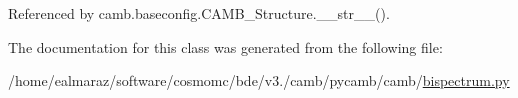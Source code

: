 Referenced by camb.\+baseconfig.\+C\+A\+M\+B\+\_\+\+Structure.\+\_\+\+\_\+str\+\_\+\+\_\+().



The documentation for this class was generated from the following file\+:\begin{DoxyCompactItemize}
\item 
/home/ealmaraz/software/cosmomc/bde/v3./camb/pycamb/camb/\mbox{\hyperlink{bispectrum_8py}{bispectrum.\+py}}\end{DoxyCompactItemize}
